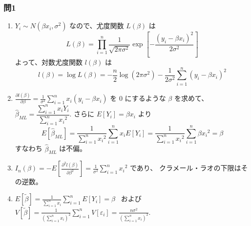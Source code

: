 \documentclass[./main.tex]{subfiles}
\begin{document}
    \subsubsection*{問1}

    \begin{enumerate}
        \item $Y_i \sim N (\beta x_i, \sigma^2)$ なので、尤度関数 $L(\beta)$ は
        \begin{equation*}
            L (\beta)
                = \prod_{i=1}^{n} \frac{1}{\sqrt{2 \pi \sigma^2}}
                    \exp \left[ - \frac{(y_i - \beta x_i)^2}{2\sigma^2} \right]
        \end{equation*}
        よって、対数尤度関数 $l (\beta)$ は
        \begin{equation*}
            l (\beta)
                = \log L (\beta)
                = - \frac{n}{2} \log (2 \pi \sigma^2)
                    - \frac{1}{2\sigma^2} \sum_{i=1}^n (y_i - \beta x_i)^2
        \end{equation*}

        \item $\displaystyle\frac{\partial l (\beta)}{\partial \beta} = \frac{1}{\sigma^2} \sum_{i=1}^n x_i (y_i - \beta x_i)$
        を $0$ にするような $\beta$ を求めて、
        $\hat{\beta}_{ML} = \dfrac{\sum_{i=1}^n x_i Y_i}{\sum_{i=1}^n {x_i}^2}$.
        さらに $E [Y_i] = \beta x_i$ より
        \begin{equation*}
            E\left[\hat{\beta}_{ML} \right]
                = \frac{1}{\sum_{i=1}^n {x_i}^2} \sum_{i=1}^n x_i E[Y_i]
                = \frac{1}{\sum_{i=1}^n {x_i}^2} \sum_{i=1}^n \beta {x_i}^2
                = \beta
        \end{equation*}
        すなわち $\hat{\beta}_{ML}$ は不偏。


        \item $\displaystyle I_n (\beta) = -E \left[ \frac{\partial^2 l(\beta)}{\partial \beta^2} \right]
                = \frac{1}{\sigma^2} \sum_{i=1}^n {x_i}^2$ であり、
                クラメール・ラオの下限はその逆数。

        \item $\displaystyle E [\tilde{\beta}] 
                = \frac{1}{\sum_{i=1}^n x_i} \sum_{i=1}^n E [Y_i]
                = \beta$
            \ および \ 
            $\displaystyle V [ \tilde{\beta}]
                = \frac{1}{ \left( \sum_{i=1}^n x_i \right)^2} \sum_{i=1}^n V [\varepsilon_i]
                = \frac{n \sigma^2}{\left( \sum_{i=1}^n x_i  \right)^2}$.
        

\end{enumerate}
\end{document}
